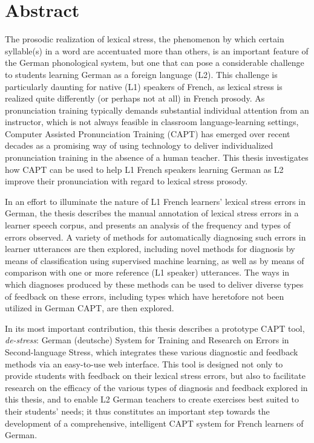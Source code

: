 %
\chapter*{Abstract}
\label{sec:abstract}
\vspace*{-10mm}

The prosodic realization of lexical stress, the phenomenon by which certain syllable(s) in a word are accentuated more than others, is an important feature of the German phonological system, but one that can pose a considerable challenge to students learning German as a foreign language (L2). This challenge is particularly daunting for native (L1) speakers of French, as lexical stress is realized quite differently (or perhaps not at all) in French prosody.
As pronunciation training typically demands substantial individual attention from an instructor, which is not always feasible in classroom language-learning settings, Computer Assisted Pronunciation Training (CAPT) has emerged over recent decades as a promising way of using technology to deliver individualized pronunciation training in the absence of a human teacher.
This thesis investigates how CAPT can be used to help L1 French speakers learning German as L2 improve their pronunciation with regard to lexical stress prosody.

In an effort to illuminate the nature of L1 French learners' lexical stress errors in German, the thesis 
describes the manual annotation of lexical stress errors in a learner speech corpus,
and presents an analysis of the frequency and types of errors observed.
A variety of methods for automatically diagnosing such errors in learner utterances are then explored, including novel methods for diagnosis by means of classification using supervised machine learning, as well as by means of comparison with one or more reference (L1 speaker) utterances.
The ways in which diagnoses produced by these methods can be used to deliver diverse types of feedback on these errors, including types which have heretofore not been utilized in German CAPT, are then explored. 

In its most important contribution, this thesis describes a prototype CAPT tool, \textit{de-stress}: German (deutsche) System for Training and Research on Errors in Second-language Stress, which integrates these various diagnostic and feedback methods via an easy-to-use web interface. 
This tool is designed not only to provide students with feedback on their lexical stress errors, but also to facilitate research on the efficacy of the various
 types of diagnosis and feedback
 explored in this thesis, and to enable L2 German teachers 
 to create exercises best suited to their students' needs; it thus constitutes an important step towards the development of a comprehensive, intelligent CAPT system for French learners of German. 




\vspace*{20mm}

%
